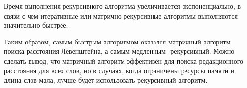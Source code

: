 Время выполнения рекурсивного алгоритма увеличивается экспоненциально, в связи с чем итеративные или матрично-рекурсивные алгоритмы выполняются значительно быстрее.
\par Таким образом, самым быстрым алгоритмом оказался матричный алгоритм поиска расстояния Левенштейна, а самым медленным- рекурсивный. Можно сделать вывод, что матричный алгоритм эффективен для поиска редакционного расстояния для всех слов, но в случаях, когда ограничены ресурсы памяти и длина слов мала, лучше будет использовать рекурсивный алгоритм.
